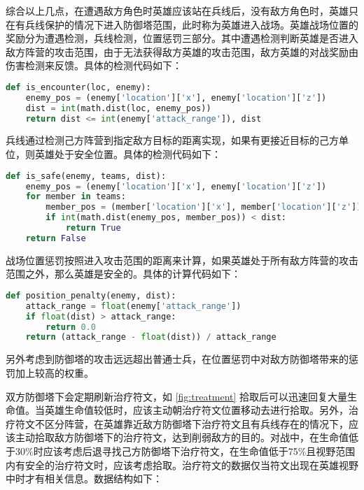 综合以上几点，在遭遇敌方角色时英雄应该站在兵线后，没有敌方角色时，英雄只在有兵线保护的情况下进入防御塔范围，此时称为英雄进入战场。英雄战场位置的奖励分为遭遇检测，兵线检测，位置惩罚三部分。其中遭遇检测判断英雄是否进入敌方阵营的攻击范围，由于无法获得敌方英雄的攻击范围，敌方英雄的对战奖励由伤害检测来反馈。具体的检测代码如下：

\begin{lstlisting}[language=Python]
def is_encounter(loc, enemy):
    enemy_pos = (enemy['location']['x'], enemy['location']['z'])
    dist = int(math.dist(loc, enemy_pos))
    return dist <= int(enemy['attack_range']), dist
\end{lstlisting}

兵线通过检测己方阵营到指定敌方目标的距离实现，如果有更接近目标的己方单位，则英雄处于安全位置。具体的检测代码如下：

\begin{lstlisting}[language=Python]
def is_safe(enemy, teams, dist):
    enemy_pos = (enemy['location']['x'], enemy['location']['z'])
    for member in teams:
        member_pos = (member['location']['x'], member['location']['z'])
        if int(math.dist(enemy_pos, member_pos)) < dist:
            return True
    return False
\end{lstlisting}

战场位置惩罚按照进入攻击范围的距离来计算，如果英雄处于所有敌方阵营的攻击范围之外，那么英雄是安全的。具体的计算代码如下：

\begin{lstlisting}[language=Python]
def position_penalty(enemy, dist):
    attack_range = float(enemy['attack_range'])
    if float(dist) > attack_range:
        return 0.0
    return (attack_range - float(dist)) / attack_range
\end{lstlisting}

另外考虑到防御塔的攻击远远超出普通士兵，在位置惩罚中对敌方防御塔带来的惩罚加上较高的权重。


双方防御塔下会定期刷新治疗符文，如 \cref{fig:treatment} 拾取后可以迅速回复大量生命值。当英雄生命值较低时，应该主动朝治疗符文位置移动去进行拾取。另外，治疗符文不区分阵营，在英雄靠近敌方防御塔下治疗符文且有兵线存在的情况下，应该主动拾取敌方防御塔下的治疗符文，达到削弱敌方的目的。对战中，在生命值低于30\%时应该考虑后退寻找己方防御塔下治疗符文，在生命值低于75\%且视野范围内有安全的治疗符文时，应该考虑拾取。治疗符文的数据仅当符文出现在英雄视野中时才有相关信息。数据结构如下：

